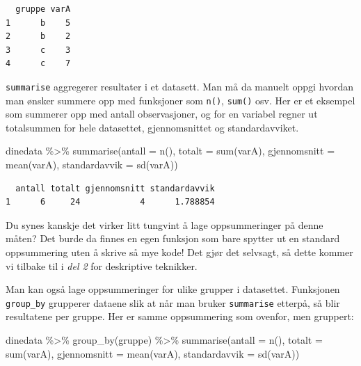 \documentclass[
  letterpaper,
  DIV=11,
  numbers=noendperiod]{scrreprt}
\newenvironment{Shaded}{\begin{snugshade}}{\end{snugshade}}
\newcommand{\AttributeTok}[1]{\textcolor[rgb]{0.40,0.45,0.13}{#1}}
\newcommand{\FunctionTok}[1]{\textcolor[rgb]{0.28,0.35,0.67}{#1}}
\newcommand{\NormalTok}[1]{\textcolor[rgb]{0.00,0.23,0.31}{#1}}
\newcommand{\SpecialCharTok}[1]{\textcolor[rgb]{0.37,0.37,0.37}{#1}}
\theoremstyle{definition}
\theoremstyle{remark}
\begin{document}
\begin{verbatim}
  gruppe varA
1      b    5
2      b    2
3      c    3
4      c    7
\end{verbatim}

\texttt{summarise} aggregerer resultater i et datasett. Man må da
manuelt oppgi hvordan man ønsker summere opp med funksjoner som
\texttt{n()}, \texttt{sum()} osv. Her er et eksempel som summerer opp
med antall observasjoner, og for en variabel regner ut totalsummen for
hele datasettet, gjennomsnittet og standardavviket.

\begin{Shaded}
\begin{Highlighting}[]
\NormalTok{dinedata }\SpecialCharTok{\%\textgreater{}\%} 
  \FunctionTok{summarise}\NormalTok{(}\AttributeTok{antall =} \FunctionTok{n}\NormalTok{(), }\AttributeTok{totalt =} \FunctionTok{sum}\NormalTok{(varA), }\AttributeTok{gjennomsnitt =} \FunctionTok{mean}\NormalTok{(varA), }\AttributeTok{standardavvik =} \FunctionTok{sd}\NormalTok{(varA))}
\end{Highlighting}
\end{Shaded}

\begin{verbatim}
  antall totalt gjennomsnitt standardavvik
1      6     24            4      1.788854
\end{verbatim}

Du synes kanskje det virker litt tungvint å lage oppsummeringer på denne
måten? Det burde da finnes en egen funksjon som bare spytter ut en
standard oppsummering uten å skrive så mye kode! Det gjør det selvsagt,
så dette kommer vi tilbake til i \emph{del 2} for deskriptive teknikker.

Man kan også lage oppsummeringer for ulike grupper i datasettet.
Funksjonen \texttt{group\_by} grupperer dataene slik at når man bruker
\texttt{summarise} etterpå, så blir resultatene per gruppe. Her er samme
oppsummering som ovenfor, men gruppert:

\begin{Shaded}
\begin{Highlighting}[]
\NormalTok{dinedata }\SpecialCharTok{\%\textgreater{}\%} 
  \FunctionTok{group\_by}\NormalTok{(gruppe) }\SpecialCharTok{\%\textgreater{}\%} 
  \FunctionTok{summarise}\NormalTok{(}\AttributeTok{antall =} \FunctionTok{n}\NormalTok{(), }\AttributeTok{totalt =} \FunctionTok{sum}\NormalTok{(varA), }\AttributeTok{gjennomsnitt =} \FunctionTok{mean}\NormalTok{(varA), }\AttributeTok{standardavvik =} \FunctionTok{sd}\NormalTok{(varA)) }
\end{Highlighting}
\end{Shaded}
\end{document}
